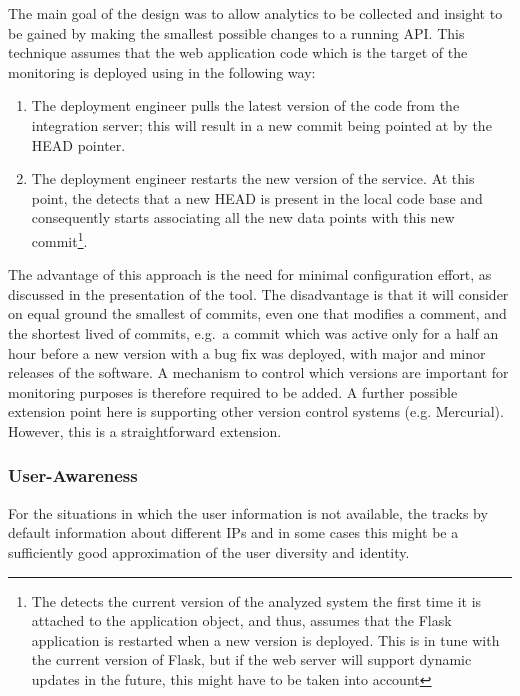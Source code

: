 \documentclass{sig-alternate-05-2015}
\begin{document}
  The main goal of the \tool design was to allow analytics to be collected and insight to be gained by making the smallest possible changes to a running API. %
%
  This technique assumes that the web application code which is the target of the monitoring is deployed using \git in the following way: 

  \begin{enumerate}
    \item The deployment engineer pulls the latest version of the code from the integration server; this will result in a new commit being pointed at by the HEAD pointer. %
    \item The deployment engineer restarts the new version of the service. At this point, the \tool detects that a new HEAD is present in the local code base and consequently starts associating all the new data points with this new commit\footnote{The \tool detects the current version of the analyzed system the first time it is attached to the application object, and thus, assumes that the Flask application is restarted when a new version is deployed. This is in tune with the current version of Flask, but if the web server will support dynamic updates in the future, this might have to be taken into account}.
  \end{enumerate}

  The advantage of this approach is the need for minimal configuration effort, as discussed in the presentation of the tool. The disadvantage is that it will consider on equal ground the smallest of commits, even one that modifies a comment, and the shortest lived of commits, e.g.~a commit which was active only for a half an hour before a new version with a bug fix was deployed, with major and minor releases of the software. %
  A mechanism to control which versions are important for monitoring purposes is therefore required to be added.
%
  A further possible extension point here is supporting other version control systems (e.g. Mercurial). However, this is a straightforward extension.



  \subsubsection{User-Awareness }

    For the situations in which the user information is not available, the \tool tracks by default information about different IPs and in some cases this might be a sufficiently good approximation of the user diversity and identity. 
\end{document}
